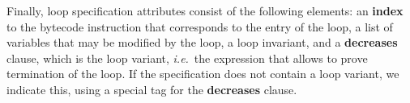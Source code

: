 

Finally, loop specification attributes consist of the following elements: an
\textbf{index} to the bytecode instruction that corresponds to the
entry of the loop, a list of variables that may be modified by the
loop, a loop invariant, and a \textbf{decreases} clause, which is the
loop variant, \emph{i.e.}\ the expression that allows to prove
termination of the loop. If the specification does not contain a loop
variant, we indicate this, using a special tag for the
\textbf{decreases} clause. %

